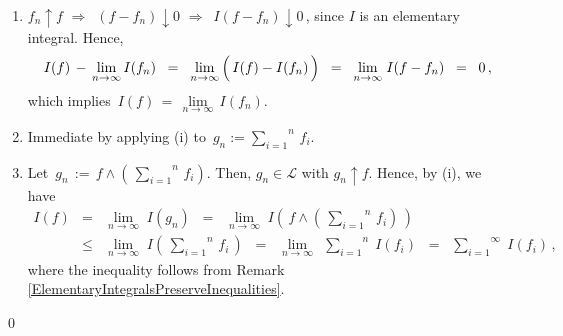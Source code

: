 \begin{enumerate}
\item
	$f_{n} \uparrow f$
	\;\;$\Longrightarrow$\,\; $(f - f_{n}) \downarrow 0$
	\;\;$\Longrightarrow$\,\; $I(f - f_{n}) \downarrow 0$\,,
	since $I$ is an elementary integral.
	Hence,
	\begin{equation*}
	I(f) \,- \,\underset{n\rightarrow\infty}{\lim}\,I(f_{n})
	\;\; = \;\;
		\underset{n\rightarrow\infty}{\lim} \left(\, I(f) \overset{{\color{white}.}}{-} I(f_{n}) \,\right)
	\;\; = \;\;
		\underset{n\rightarrow\infty}{\lim}\;I(f \overset{{\color{white}.}}{-} f_{n})
	\;\; = \;\;
		0\,,
	\end{equation*}
	which implies \,$I(f) \,=\,\underset{n\rightarrow\infty}{\lim}\,I(f_{n})$.
\item
	Immediate by applying (i) to \,$g_{n} := \overset{n}{\underset{i=1}{\sum}}\,f_{i}$.
\item
	Let \,$g_{n} \,:=\, f \wedge \left(\,\overset{n}{\underset{i=1}{\sum}}\,f_{i}\right)$.
	Then, $g_{n} \in \mathcal{L}$ with $g_{n} \uparrow f$.
	Hence, by (i), we have
	\begin{eqnarray*}
	I(f)
	&=&
		\underset{n\rightarrow\infty}{\lim}\;I(g_{n})
	\;\; = \;\;
		\underset{n\rightarrow\infty}{\lim}\;I\!\left(\,f \wedge \left(\,\overset{n}{\underset{i=1}{\sum}}\,f_{i}\right)\,\right)
	\\
	&\leq&
		\underset{n\rightarrow\infty}{\lim}\;I\!\left(\,\overset{n}{\underset{i=1}{\sum}}\,f_{i}\,\right)
	\;\; = \;\;
		\underset{n\rightarrow\infty}{\lim}\;\,\overset{n}{\underset{i=1}{\sum}}\;I(f_{i})
	\;\; = \;\;
		\overset{\infty}{\underset{i=1}{\sum}}\;I(f_{i})\,,
	\end{eqnarray*}
	where the inequality follows from Remark \ref{ElementaryIntegralsPreserveInequalities}.
\end{enumerate}
\qed


\renewcommand{\theenumi}{\roman{enumi}}
\renewcommand{\labelenumi}{\textnormal{(\theenumi)}$\;\;$}


